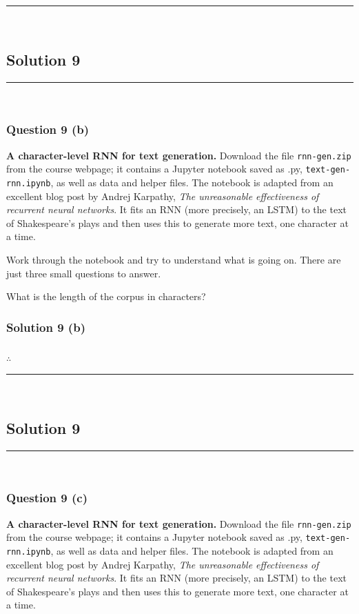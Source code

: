\documentclass{article}
\begin{document}
{{{\noindent\rule{\textwidth}{0.4pt}\\

\newpage
\subsection*{Solution 9}
\noindent\rule{\textwidth}{0.4pt}\\
\subsubsection*{Question 9 (b)}
\begin{flushleft}
\textbf{A character-level RNN for text generation.} Download the file \texttt{rnn-gen.zip} from the course webpage; it contains a Jupyter notebook saved as .py, \texttt{text-gen-rnn.ipynb}, as well as data and helper files. The notebook is adapted from an excellent blog post by Andrej Karpathy, \textit{The unreasonable effectiveness of recurrent neural networks}. It fits an RNN (more precisely, an LSTM) to the text of Shakespeare's plays and then uses this to generate more text, one character at a time.

Work through the notebook and try to understand what is going on. There are just three small questions to answer.

    What is the length of the corpus in characters? 
\end{flushleft}

\subsubsection*{Solution 9 (b)}


\subsubsection*{\normalfont}{$\therefore$ }

\noindent\rule{\textwidth}{0.4pt}\\

\newpage

\subsection*{Solution 9}
\noindent\rule{\textwidth}{0.4pt}\\
\subsubsection*{Question 9 (c)}
\begin{flushleft}
\textbf{A character-level RNN for text generation.} Download the file \texttt{rnn-gen.zip} from the course webpage; it contains a Jupyter notebook saved as .py, \texttt{text-gen-rnn.ipynb}, as well as data and helper files. The notebook is adapted from an excellent blog post by Andrej Karpathy, \textit{The unreasonable effectiveness of recurrent neural networks}. It fits an RNN (more precisely, an LSTM) to the text of Shakespeare's plays and then uses this to generate more text, one character at a time.


\end{flushleft}}}}
\end{document}
